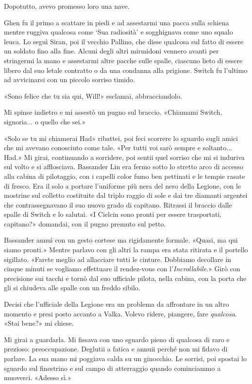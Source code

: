 Dopotutto, avevo promesso loro una nave.

Ghen fu il primo a scattare in piedi e ad assestarmi una pacca sulla
schiena mentre ruggiva qualcosa come `Sua radiosità' e sogghignava come
uno squalo leuca. Lo seguì Siran, poi il vecchio Pallino, che disse
qualcosa sul fatto di essere un soldato fino alla fine. Alcuni degli
altri mirmidoni vennero avanti per stringermi la mano e assestarmi altre
pacche sulle spalle, ciascuno lieto di essere libero dal suo letale
contratto o da una condanna alla prigione. Switch fu l'ultimo ad
avvicinarsi con un piccolo sorriso timido.

«Sono felice che tu sia qui, Will!» esclamai, abbracciandolo.

Mi spinse indietro e mi assestò un pugno sul braccio. «Chiamami Switch,
signoria... o quello che sei.»

«Solo se tu mi chiamerai Had» ribattei, poi feci scorrere lo sguardo
sugli amici che mi avevano conosciuto come tale. «Per tutti voi sarò
sempre e soltanto... Had.» Mi girai, continuando a sorridere, poi sentii
quel sorriso che mi si induriva sul volto e si afflosciava. Bassander
Lin era fermo sotto lo stretto arco di accesso alla cabina di
pilotaggio, con i capelli color fumo ben pettinati e le tempie rasate di
fresco. Era il solo a portare l'uniforme più nera del nero della
Legione, con le mostrine sul colletto costituite dal triplo raggio di
sole e dai tre diamanti argentei che contrassegnavano il suo nuovo grado
di capitano. Ritrassi il braccio dalle spalle di Switch e lo salutai. «I
Cielcin sono pronti per essere trasportati, capitano?» domandai, con il
pugno premuto sul petto.

Bassander annuì con un gesto cortese ma rigidamente formale. «Quasi, ma
qui siamo pronti.» Mentre parlavo con gli altri la rampa era stata
ritirata e il portello sigillato. «Farete meglio ad allacciare tutti le
cinture. Dobbiamo decollare in cinque minuti se vogliamo effettuare il
rendez-vous con l'\emph{Incrollabile}.» Girò con precisione sui tacchi e
tornò dal suo ufficiale pilota, nella cabina, con la porta che gli si
chiudeva alle spalle con un freddo sibilo.

Decisi che l'ufficiale della Legione era un problema da affrontare in un
altro momento e presi posto accanto a Valka. Volevo ridere, piangere,
fare \emph{qualcosa}. «Stai bene?» mi chiese.

Mi girai a guardarla. Mi fissava con uno sguardo pieno di qualcosa di
raro e prezioso: preoccupazione. Deglutii a fatica e annuii perché non
mi fidavo di parlare. La sua mano mi poggiava calda su un ginocchio. Le
sorrisi, poi spostai lo sguardo sul finestrino e sul campo di
atterraggio quando cominciammo a muoverci. «Adesso sì.»

